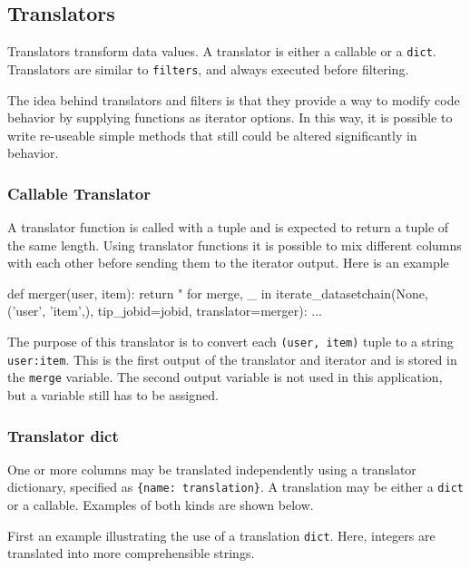 \subsection{Translators}

Translators transform data values. A translator is either a callable or
a \texttt{dict}.  Translators are similar to \texttt{filters}, and
always executed before filtering.

The idea behind translators and filters is that they provide a way to
modify code behavior by supplying functions as iterator options.  In
this way, it is possible to write re-useable simple methods that still
could be altered significantly in behavior.



\subsubsection*{Callable Translator}

A translator function is called with a tuple and is expected to return
a tuple of the same length.  Using translator functions it is possible
to mix different columns with each other before sending them to the
iterator output.  Here is an example

\begin{python}
def merger(user, item):
    return "%
for merge, _ in iterate_datasetchain(None, ('user', 'item',), tip_jobid=jobid,
                                     translator=merger):
    ...
\end{python}
The purpose of this translator is to convert each
\texttt{(user, item)} tuple to a string \texttt{user:item}.  This is
the first output of the translator and iterator and is stored in the
\texttt{merge} variable.  The second output variable is not used in
this application, but a variable still has to be assigned.



\subsubsection*{Translator dict}

One or more columns may be translated independently using a translator
dictionary, specified as \texttt{\{name:\ translation\}}.  A
translation may be either a \texttt{dict} or a callable.  Examples of
both kinds are shown below.

First an example illustrating the use of a translation \texttt{dict}.
Here, integers are translated into more comprehensible strings.

